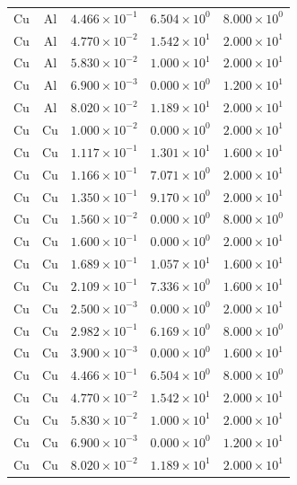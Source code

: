 \documentclass{article}
\begin{document}
\begin{longtable}{ccccc}
Cu &  Al & $4.466 \times 10^{-1}$ & $6.504 \times 10^{0}$ & $8.000 \times 10^{0}$ \\
Cu &  Al & $4.770 \times 10^{-2}$ & $1.542 \times 10^{1}$ & $2.000 \times 10^{1}$ \\
Cu &  Al & $5.830 \times 10^{-2}$ & $1.000 \times 10^{1}$ & $2.000 \times 10^{1}$ \\
Cu &  Al & $6.900 \times 10^{-3}$ & $0.000 \times 10^{0}$ & $1.200 \times 10^{1}$ \\
Cu &  Al & $8.020 \times 10^{-2}$ & $1.189 \times 10^{1}$ & $2.000 \times 10^{1}$ \\
Cu &  Cu & $1.000 \times 10^{-2}$ & $0.000 \times 10^{0}$ & $2.000 \times 10^{1}$ \\
Cu &  Cu & $1.117 \times 10^{-1}$ & $1.301 \times 10^{1}$ & $1.600 \times 10^{1}$ \\
Cu &  Cu & $1.166 \times 10^{-1}$ & $7.071 \times 10^{0}$ & $2.000 \times 10^{1}$ \\
Cu &  Cu & $1.350 \times 10^{-1}$ & $9.170 \times 10^{0}$ & $2.000 \times 10^{1}$ \\
Cu &  Cu & $1.560 \times 10^{-2}$ & $0.000 \times 10^{0}$ & $8.000 \times 10^{0}$ \\
Cu &  Cu & $1.600 \times 10^{-1}$ & $0.000 \times 10^{0}$ & $2.000 \times 10^{1}$ \\
Cu &  Cu & $1.689 \times 10^{-1}$ & $1.057 \times 10^{1}$ & $1.600 \times 10^{1}$ \\
Cu &  Cu & $2.109 \times 10^{-1}$ & $7.336 \times 10^{0}$ & $1.600 \times 10^{1}$ \\
Cu &  Cu & $2.500 \times 10^{-3}$ & $0.000 \times 10^{0}$ & $2.000 \times 10^{1}$ \\
Cu &  Cu & $2.982 \times 10^{-1}$ & $6.169 \times 10^{0}$ & $8.000 \times 10^{0}$ \\
Cu &  Cu & $3.900 \times 10^{-3}$ & $0.000 \times 10^{0}$ & $1.600 \times 10^{1}$ \\
Cu &  Cu & $4.466 \times 10^{-1}$ & $6.504 \times 10^{0}$ & $8.000 \times 10^{0}$ \\
Cu &  Cu & $4.770 \times 10^{-2}$ & $1.542 \times 10^{1}$ & $2.000 \times 10^{1}$ \\
Cu &  Cu & $5.830 \times 10^{-2}$ & $1.000 \times 10^{1}$ & $2.000 \times 10^{1}$ \\
Cu &  Cu & $6.900 \times 10^{-3}$ & $0.000 \times 10^{0}$ & $1.200 \times 10^{1}$ \\
Cu &  Cu & $8.020 \times 10^{-2}$ & $1.189 \times 10^{1}$ & $2.000 \times 10^{1}$ \\
\hline
\end{longtable}
\egroup
\end{document}
